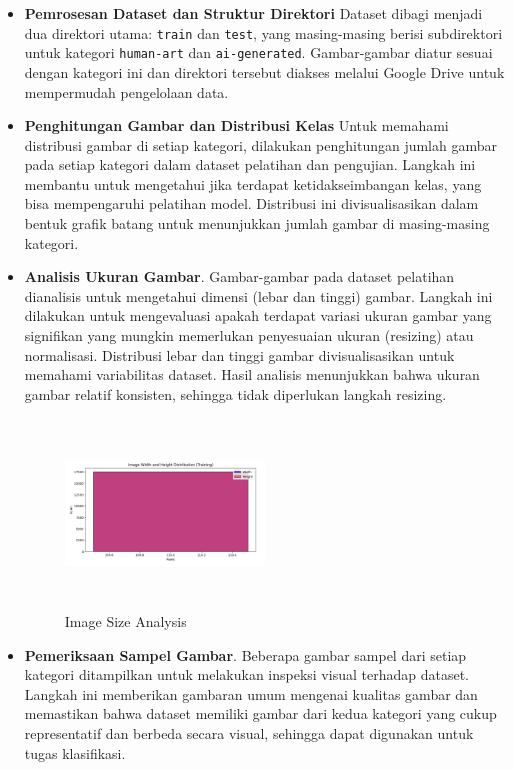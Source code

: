\documentclass[12pt,a4paper]{article}
\begin{document}
\begin{itemize}
    \item \textbf{Pemrosesan Dataset dan Struktur Direktori}
    Dataset dibagi menjadi dua direktori utama: \texttt{train} dan \texttt{test}, yang masing-masing berisi subdirektori untuk kategori \texttt{human-art} dan \texttt{ai-generated}. Gambar-gambar diatur sesuai dengan kategori ini dan direktori tersebut diakses melalui Google Drive untuk mempermudah pengelolaan data.

\item \textbf{Penghitungan Gambar dan Distribusi Kelas}
    Untuk memahami distribusi gambar di setiap kategori, dilakukan penghitungan jumlah gambar pada setiap kategori dalam dataset pelatihan dan pengujian. Langkah ini membantu untuk mengetahui jika terdapat ketidakseimbangan kelas, yang bisa mempengaruhi pelatihan model. Distribusi ini divisualisasikan dalam bentuk grafik batang untuk menunjukkan jumlah gambar di masing-masing kategori.

\newpage
\item \textbf{Analisis Ukuran Gambar}.
    Gambar-gambar pada dataset pelatihan dianalisis untuk mengetahui dimensi (lebar dan tinggi) gambar. Langkah ini dilakukan untuk mengevaluasi apakah terdapat variasi ukuran gambar yang signifikan yang mungkin memerlukan penyesuaian ukuran (resizing) atau normalisasi. Distribusi lebar dan tinggi gambar divisualisasikan untuk memahami variabilitas dataset. Hasil analisis menunjukkan bahwa ukuran gambar relatif konsisten, sehingga tidak diperlukan langkah resizing.

     \begin{figure}[h]
        \centering
        \includegraphics[width=0.5\textwidth, height=5cm]{size.png}  %
        \caption{Image Size Analysis}
    \end{figure}

\item \textbf{Pemeriksaan Sampel Gambar}.
    Beberapa gambar sampel dari setiap kategori ditampilkan untuk melakukan inspeksi visual terhadap dataset. Langkah ini memberikan gambaran umum mengenai kualitas gambar dan memastikan bahwa dataset memiliki gambar dari kedua kategori yang cukup representatif dan berbeda secara visual, sehingga dapat digunakan untuk tugas klasifikasi.


\end{itemize}
\end{document}
